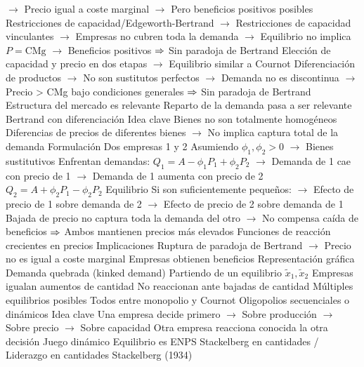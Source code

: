 \documentclass{nuevotema}
\begin{document}
\begin{esquemal}
				\4[] $\to$ Precio igual a coste marginal
				\4[] $\to$ Pero beneficios positivos posibles
				\4[] Restricciones de capacidad/Edgeworth-Bertrand
				\4[] $\to$ Restricciones de capacidad vinculantes
				\4[] $\to$ Empresas no cubren toda la demanda
				\4[] $\to$ Equilibrio no implica $P=\text{CMg}$
				\4[] $\to$ Beneficios positivos
				\4[] $\then$ Sin paradoja de Bertrand
				\4[] Elección de capacidad y precio en dos etapas
				\4[] $\to$ Equilibrio similar a Cournot
				\4[] Diferenciación de productos
				\4[] $\to$ No son sustitutos perfectos
				\4[] $\to$ Demanda no es discontinua
				\4[] $\to$ Precio > CMg bajo condiciones generales
				\4[] $\then$ Sin paradoja de Bertrand
				\4[$\then$] Estructura del mercado es relevante
				\4[$\then$] Reparto de la demanda pasa a ser relevante
			\3 Bertrand con diferenciación
				\4 Idea clave
				\4[] Bienes no son totalmente homogéneos
				\4[] Diferencias de precios de diferentes bienes
				\4[] $\to$ No implica captura total de la demanda
				\4 Formulación
				\4[] Dos empresas 1 y 2
				\4[] Asumiendo $\phi_1, \phi_2 >0$
				\4[] $\to$ Bienes sustitutivos
				\4[] Enfrentan demandas:
				\4[] $Q_1 = A -\phi_1 P_1 + \phi_2 P_2$
				\4[] $\to$ Demanda de 1 cae con precio de 1
				\4[] $\to$ Demanda de 1 aumenta con precio de 2
				\4[] $Q_2 = A +\phi_2 P_1 - \phi_2 P_2$
				\4 Equilibrio
				\4[] Si son suficientemente pequeños:
				\4[] $\to$ Efecto de precio de 1 sobre demanda de 2
				\4[] $\to$ Efecto de precio de 2 sobre demanda de 1
				\4[] Bajada de precio no captura toda la demanda del otro
				\4[] $\to$ No compensa caída de beneficios
				\4[] $\then$ Ambos mantienen precios más elevados
				\4[] Funciones de reacción crecientes en precios
				\4 Implicaciones
				\4[] Ruptura de paradoja de Bertrand
				\4[] $\to$ Precio no es igual a coste marginal
				\4[] Empresas obtienen beneficios
				\4 Representación gráfica
				\4[] 
			\3 Demanda quebrada (kinked demand)
				\4 Partiendo de un equilibrio $\tilde{x}_1, \tilde{x}_2$
				\4[] Empresas igualan aumentos de cantidad
				\4[] No reaccionan ante bajadas de cantidad
				\4 Múltiples equilibrios posibles
				\4[] Todos entre monopolio y Cournot
		\2 Oligopolios secuenciales o dinámicos
			\3 Idea clave
				\4 Una empresa decide primero
				\4[] $\to$ Sobre producción
				\4[] $\to$ Sobre precio
				\4[] $\to$ Sobre capacidad
				\4 Otra empresa reacciona conocida la otra decisión
				\4 Juego dinámico
				\4[$\then$] Equilibrio es ENPS
			\3 Stackelberg en cantidades / Liderazgo en cantidades
				\4 Stackelberg (1934)

\end{esquemal}
\end{document}
